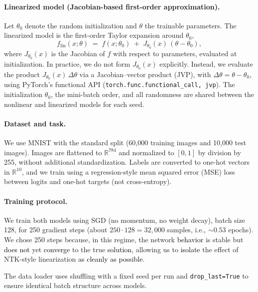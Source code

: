 \documentclass{article} %
\begin{document}
\paragraph{Linearized model (Jacobian-based first-order approximation).}
Let \(\theta_0\) denote the random initialization and \(\theta\) the trainable parameters. The linearized model is the first-order Taylor expansion around \(\theta_0\),
\begin{equation}
f_{\text{lin}}(x;\theta)\;=\; f(x;\theta_0)\;+\;J_{\theta_0}(x)\,(\theta-\theta_0),
\end{equation}
where \(J_{\theta_0}(x)\) is the Jacobian of \(f\) with respect to parameters, evaluated at initialization. In practice, we do not form \(J_{\theta_0}(x)\) explicitly. Instead, we evaluate the product \(J_{\theta_0}(x)\,\Delta\theta\) via a Jacobian--vector product (JVP), with \(\Delta\theta=\theta-\theta_0\), using PyTorch's functional API (\texttt{torch.func.functional\_call, jvp}). The initialization \(\theta_0\), the mini-batch order, and all randomness are shared between the nonlinear and linearized models for each seed.

\paragraph{Dataset and task.}
We use MNIST with the standard split (60{,}000 training images and 10{,}000 test images). Images are flattened to \(\mathbb{R}^{784}\) and normalized to \([0,1]\) by division by 255, without additional standardization. Labels are converted to one-hot vectors in \(\mathbb{R}^{10}\), and we train using a regression-style mean squared error (MSE) loss between logits and one-hot targets (not cross-entropy).

\paragraph{Training protocol.}
We train both models using SGD (no momentum, no weight decay), batch size 128, for 250 gradient steps (about \(250\cdot 128 = 32{,}000\) samples, i.e., \(\sim 0.53\) epochs). We chose 250 steps because, in this regime, the network \textcolor{black}{behavior} is stable but \textcolor{black}{does not} yet \textcolor{black}{converge} to the true \textcolor{black}{solution}, allowing us to \textcolor{black}{isolate} the effect of NTK-style linearization \textcolor{black}{as cleanly as possible}.

The data loader uses shuffling with a fixed seed per run and \texttt{drop\_last=True} to ensure identical batch structure across models.
\end{document}
